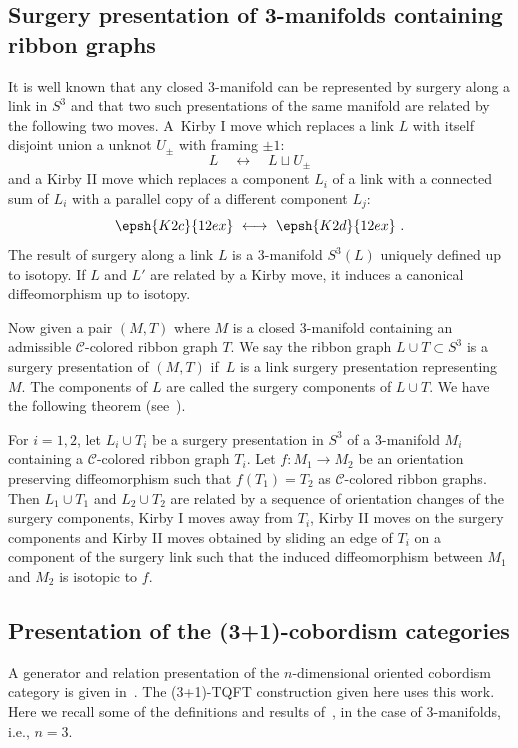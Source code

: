 \documentclass[pdftex]{sigma}
\numberwithin{equation}{section}
\numberwithin{theorem}{section}
\numberwithin{proposition}{section}
\numberwithin{definition}{section}
\numberwithin{lemma}{section}
\numberwithin{corollary}{section}
\numberwithin{remark}{section}
\numberwithin{example}{section}
\newcommand{\cat}{\mathcal{C}}
\begin{document}
\subsection{Surgery presentation of 3-manifolds containing ribbon graphs} It is well known that any closed 3-manifold can be represented by surgery along a link in $S^3$ and that two such presentations of the same manifold are related by the following two moves. A~Kirby I move which replaces a link $L$ with itself disjoint union a unknot $U_{\pm}$ with framing $\pm 1$:
\begin{equation*}
 L\quad\longleftrightarrow\quad L\sqcup U_{\pm}
\end{equation*}
and
 a Kirby II move which replaces a component $L_i$ of a link with a connected
sum of $L_i$ with a parallel copy of a different component $L_j$:
\begin{equation}
 \label{eq:Kirby2}
 \epsh{K2c}{12ex}\ \longleftrightarrow\ \epsh{K2d}{12ex}\ .
\end{equation}
The result of surgery along a link $L$ is a 3-manifold
$S^3(L)$ uniquely defined up to isotopy. If $L$ and $L'$ are related by a
Kirby move, it induces a canonical diffeomorphism
 up to isotopy.

Now given a pair $(M,T)$ where $M$ is a closed 3-manifold containing an admissible $\cat$-colored ribbon graph $T$.
 We say the ribbon graph $L \cup T \subset S^3$ is a surgery presentation of $(M,T)$ if~$L$ is a link surgery presentation representing $M$. The components of $L$ are called the surgery components of $L\cup T$.
 We have the following theorem (see~\cite{CGP14}).
\begin{theorem}\label{T:SurgPresRelatedbyKirby}
 For $i=1,2$, let $L_i\cup T_i$ be a surgery presentation in $S^3$ of a $3$-manifold $M_i$ containing a $\cat$-colored ribbon graph $T_i$. Let
 $f\colon M_1\to M_2$ be an orientation preserving diffeomorphism such that
 $f(T_1)=T_2$ as $\cat$-colored ribbon graphs. Then $L_1\cup T_1$ and
 $L_2\cup T_2$ are related by a sequence of orientation changes of
 the surgery components, Kirby I moves away from $T_i$, Kirby II
 moves on the surgery components and Kirby II moves obtained by
 sliding an edge of $T_i$ on a component of the surgery link such
 that the induced diffeomorphism between $M_1$ and $M_2$ is isotopic
 to $f$.
\end{theorem}
\subsection{Presentation of the (3+1)-cobordism categories
}\label{S:Top}
A generator and relation presentation of the $n$-dimensional oriented cobordism category
is given in~\cite{Juh2018}. The (3+1)-TQFT construction given here
uses this work. Here we recall
 some of the definitions and results of~\cite{Juh2018}, in the case of 3-manifolds, i.e., $n=3$.
\end{document}
